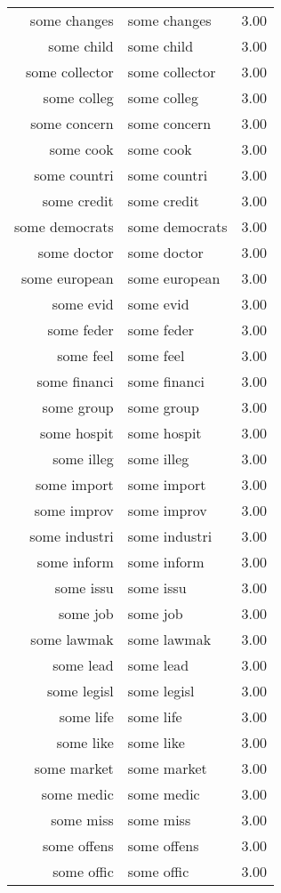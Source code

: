 \begin{table}[ht]
\begin{tabular}{rlr}
  some changes & some changes & 3.00 \\ 
  some child & some child & 3.00 \\ 
  some collector & some collector & 3.00 \\ 
  some colleg & some colleg & 3.00 \\ 
  some concern & some concern & 3.00 \\ 
  some cook & some cook & 3.00 \\ 
  some countri & some countri & 3.00 \\ 
  some credit & some credit & 3.00 \\ 
  some democrats & some democrats & 3.00 \\ 
  some doctor & some doctor & 3.00 \\ 
  some european & some european & 3.00 \\ 
  some evid & some evid & 3.00 \\ 
  some feder & some feder & 3.00 \\ 
  some feel & some feel & 3.00 \\ 
  some financi & some financi & 3.00 \\ 
  some group & some group & 3.00 \\ 
  some hospit & some hospit & 3.00 \\ 
  some illeg & some illeg & 3.00 \\ 
  some import & some import & 3.00 \\ 
  some improv & some improv & 3.00 \\ 
  some industri & some industri & 3.00 \\ 
  some inform & some inform & 3.00 \\ 
  some issu & some issu & 3.00 \\ 
  some job & some job & 3.00 \\ 
  some lawmak & some lawmak & 3.00 \\ 
  some lead & some lead & 3.00 \\ 
  some legisl & some legisl & 3.00 \\ 
  some life & some life & 3.00 \\ 
  some like & some like & 3.00 \\ 
  some market & some market & 3.00 \\ 
  some medic & some medic & 3.00 \\ 
  some miss & some miss & 3.00 \\ 
  some offens & some offens & 3.00 \\ 
  some offic & some offic & 3.00 \\ 

\end{tabular}
\end{table}
